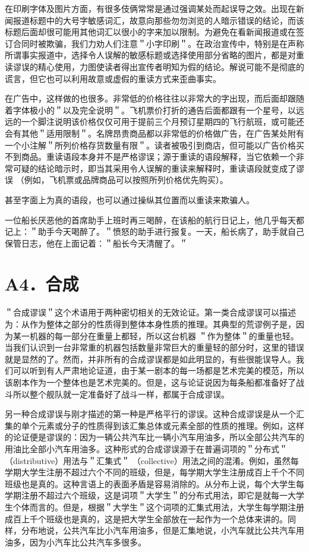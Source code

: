 在印刷字体及图片方面，有很多伎俩常常是通过强调某处而起误导之效。出现在新闻报道标题中的大号字敏感词汇，故意向那些勿勿浏览的人暗示错误的结论，而该标题后面却很可能用其他词汇以很小的字来加以限制。为避免在看新闻报道或在签订合同时被欺骗，我们力劝人们注意＂小字印刷＂。在政治宣传中，特别是在声称所谓事实报道中，选择令人误解的敏感标题或选择使用部分省略的图片，都是对重读谬误的精心使用，力图使读者得出宣传者明知为假的结论。解说可能不是彻底的谎言，但它也可以利用故意或虚假的重读方式来歪曲事实。

在广告中，这样做的也很多。非常低的价格往往以非常大的字出现，而后面却跟随着字体极小的＂以及完全说明＂。飞机票价打折的通告后面都跟有一个星号，以远远的一个脚注说明该价格仅仅可用于提前三个月预订星期四的飞行航班，或可能还会有其他＂适用限制＂。名牌昂贵商品都以非常低的价格做广告，在广告某处附有一个小注解＂所列价格存货数量有限＂。读者被吸引到商店，但可能以广告价格买不到商品。重读语段本身并不是严格谬误；源于重读的语段解释，当它依赖一个非常可疑的结论暗示时，即当其采用令人误解的重读来解释时，重读语段就变成了谬误 （例如，飞机票或品牌商品可以按照所列价格优先购买）。

甚至字面上为真的语段，也可以通过操纵其位置而以重读来欺骗人。

一位船长厌恶他的首席助手上班时再三喝醉，在该船的航行日记上，他几乎每天都记上：＂助手今天喝醉了。＂愤怒的助手进行报复。一天，船长病了，助手就自己保管日志，他在上面记着：＂船长今天清醒了。＂

\section*{A4．合成}
＂合成谬误＂这个术语用于两种密切相关的无效论证。第一类合成谬误可以描述为：从作为整体之部分的性质得到整体本身性质的推理。其典型的荒谬例子是，因为某一机器的每一部分在重量上都轻，所以这台机器 ＂作为整体＂的重量也轻。当我们认识到一台非常重的机器包括数量非常巨大的重量轻的部分时，这里的错误就是显然的了。然而，并非所有的合成谬误都是如此明显的，有些很能误导人。我们可以听到有人严肃地论证道，由于某一剧本的每一场都是艺术完美的模范，所以该剧本作为一个整体也是艺术完美的。但是，这与论证说因为每条船都准备好了战斗所以整个舰队就一定准备好了战斗一样，都属于合成谬误。

另一种合成谬误与刚才描述的第一种是严格平行的谬误。这种合成谬误是从一个汇集的单个元素或分子的性质得到该汇集总体或元素全部的性质的推理。例如，这样的论证便是谬误的：因为一辆公共汽车比一辆小汽车用油多，所以全部公共汽车的用油比全部小汽车用油多。这种形式的合成谬误源于在普遍词项的＂分布式＂（distributive）用法与＂汇集式＂ （collective）用法之间的混淆。例如，虽然每学期大学生注册不超过六个不同的班级，但是，每学期大学生注册成百上千个不同班级也是真的。这种言语上的表面矛盾是容易消除的。从分布上说，每个大学生每学期注册不超过六个班级，这是词项＂大学生＂的分布式用法，即它是就每一大学生个体而言的。但是，根据＂大学生＂这个词项的汇集式用法，大学生每学期注册成百上千个班级也是真的，这是把大学生全部放在一起作为一个总体来讲的。同样，分布地说，公共汽车比小汽车用油多，但是汇集地说，小汽车就比公共汽车用油多，因为小汽车比公共汽车多很多。

